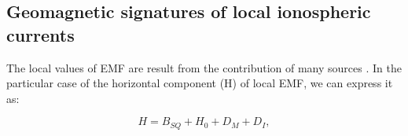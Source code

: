 \documentclass[a4paper,fleqn]{cas-dc}
\begin{document}


  


\subsection{Geomagnetic signatures of local ionospheric currents}
\label{diono}

The local values of EMF are result from the contribution of many sources \citep{1969intro_to_iono_p, l_handbook_geof_sw_Geom_field,  baseline_Gjerloev, vanKampt}. In the particular case of the horizontal component (H) of local EMF, we can express it as:



\begin{equation}
    \label{eq:1}
    H = B_{SQ} + H_0 + D_{M} + D_{I},
\end{equation}
\end{document}
